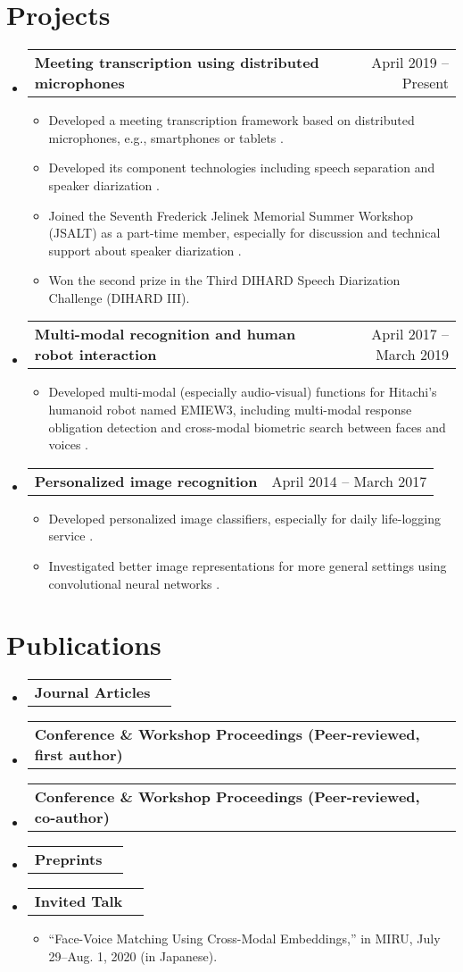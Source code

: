 \documentclass[letterpaper,11pt]{article}
\makeatletter
\newcommand{\resumeItem}[1]{
  \item\small{
    {#1 \vspace{-2pt}}
  }
}
\newcommand{\resumeShortSubheading}[2]{
  \vspace{-2pt}\item
    \begin{tabular*}{0.97\textwidth}[t]{l@{\extracolsep{\fill}}r}
      \textbf{#1} & #2 \\
    \end{tabular*}\vspace{-7pt}
}
\newcommand{\resumeProjectHeading}[2]{
    \item
    \begin{tabular*}{0.97\textwidth}{l@{\extracolsep{\fill}}r}
      \small#1 & #2 \\
    \end{tabular*}\vspace{-7pt}
}
\newcommand{\resumeSubHeadingListStart}{\begin{itemize}[leftmargin=0.15in, label={}]}
\newcommand{\resumeSubHeadingListEnd}{\end{itemize}}
\newcommand{\resumeItemListStart}{\begin{itemize}}
\newcommand{\resumeItemListEnd}{\end{itemize}\vspace{-5pt}}
\makeatother
\begin{document}
\section{Projects}
    \resumeSubHeadingListStart
      \resumeProjectHeading
          {\textbf{Meeting transcription using distributed microphones}}{April 2019 -- Present}
          \resumeItemListStart
            \resumeItem{Developed a meeting transcription framework based on distributed microphones, e.g., smartphones or tablets \cite{horiguchi2020utterancewise}.}
            \resumeItem{Developed its component technologies including speech separation \cite{horiguchi2021blockonline} and speaker diarization \cite{horiguchi2022multichannel,horiguchi2021towards,horiguchi2020endtoend,horiguchi2021endtoend}.}
            \resumeItem{Joined the Seventh Frederick Jelinek Memorial Summer Workshop (JSALT) as a part-time member, especially for discussion and technical support about speaker diarization \cite{horiguchi2021endtoend}.}
            \resumeItem{Won the second prize in the Third DIHARD Speech Diarization Challenge (DIHARD III).}
          \resumeItemListEnd
      \resumeProjectHeading
          {\textbf{Multi-modal recognition and human robot interaction}}{April 2017 -- March 2019}
          \resumeItemListStart
            \resumeItem{Developed multi-modal (especially audio-visual) functions for Hitachi's humanoid robot named EMIEW3, including multi-modal response obligation detection \cite{horiguchi2019multimodal} and cross-modal biometric search between faces and voices \cite{horiguchi2018facevoice}.}
          \resumeItemListEnd
      \resumeProjectHeading
          {\textbf{Personalized image recognition}}{April 2014 -- March 2017}
          \resumeItemListStart
            \resumeItem{Developed personalized image classifiers, especially for daily life-logging service \cite{horiguchi2018personalized}.}
            \resumeItem{Investigated better image representations for more general settings using convolutional neural networks \cite{horiguchi2020significance}.}
          \resumeItemListEnd
    \resumeSubHeadingListEnd


\section{Publications}
  \resumeSubHeadingListStart
    \resumeShortSubheading
      {Journal Articles}{}
      \nocite{*}
      \printbibliography[type=article,heading=none]
    \resumeShortSubheading
      {Conference \& Workshop Proceedings (Peer-reviewed, first author)}{}
      \printbibliography[type=inproceedings,heading=none,keyword=first]
    \resumeShortSubheading
      {Conference \& Workshop Proceedings (Peer-reviewed, co-author)}{}
      \printbibliography[type=inproceedings,heading=none,notkeyword=first]
    \resumeShortSubheading
      {Preprints}{}
      \printbibliography[type=misc,heading=none]
    \resumeShortSubheading
      {\textbf{Invited Talk}}{}
      \resumeItemListStart
        \resumeItem{``Face-Voice Matching Using Cross-Modal Embeddings,'' in MIRU, July 29--Aug. 1, 2020 (in Japanese).}
      \resumeItemListEnd
  \resumeSubHeadingListEnd
\end{document}
